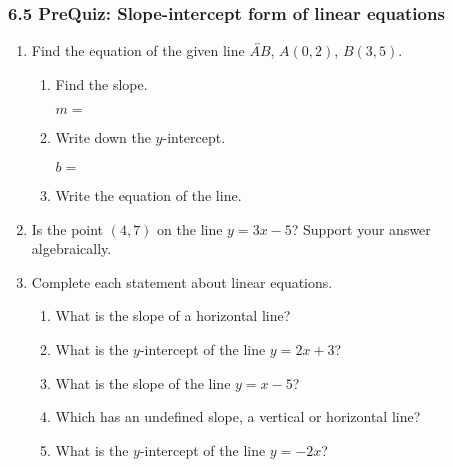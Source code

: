 

\fancyhead[LE]{\thepage}



\subsubsection*{6.5 PreQuiz: Slope-intercept form of linear equations}
\begin{enumerate}

\item Find the equation of the given line $\overleftrightarrow{AB}$, $A(0,2)$, $B(3,5)$.
\begin{multicols}{2}
    \begin{enumerate}[itemsep=0.5cm]
      \item Find the slope. \par
          $m=$
      \item Write down the $y$-intercept. \par 
        $b=$
      \item Write the equation of the line. \vspace{1cm}
      \end{enumerate}
    \begin{flushright}
    \end{flushright}
  \end{multicols}

\item Is the point $(4,7)$ on the line $y=3x-5$? Support your answer algebraically. \vspace{3cm}

\item Complete each statement about linear equations.
\begin{enumerate}[itemsep=0.25cm]
  \item What is the slope of a horizontal line?
  \item What is the $y$-intercept of the line $y = 2x + 3$?
  \item What is the slope of the line $y = x - 5$?
  \item Which has an undefined slope, a vertical or horizontal line?
  \item What is the $y$-intercept of the line $y = -2x$?
\end{enumerate} \vspace{1cm}


\end{enumerate}
